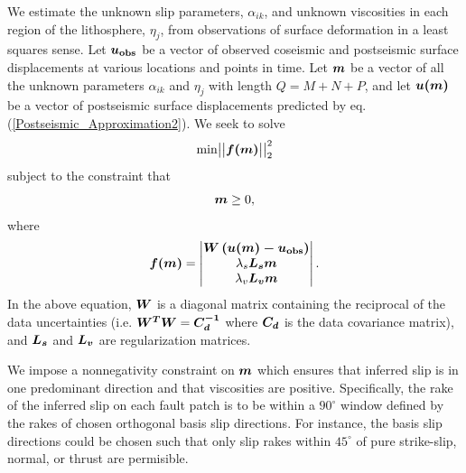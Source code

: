 \documentclass[extra,mreferee]{gji}
\begin{document}
We estimate the unknown slip parameters, $\alpha_{ik}$, and unknown
viscosities in each region of the lithosphere, $\eta_j$, from
observations of surface deformation in a least squares sense. Let
$\mitbf{u_{\mathrm{obs}}}$ be a vector of observed coseismic and postseismic
surface displacements at various locations and points in time.  Let
$\mitbf{m}$ be a vector of all the unknown parameters $\alpha_{ik}$
and $\eta_j$ with length $Q=M+N+P$, and let $\mitbf{u(m)}$ be a vector
of postseismic surface displacements predicted by eq.
(\ref{Postseismic_Approximation2}). We seek to solve
\begin{equation}\label{Inverse_Problem}
  \mathrm{min}
  \big|\big|\mitbf{f(m)}\big|\big|_2^2
\end{equation}
subject to the constraint that
\begin{equation}
  \mitbf{m}\geq0,
\end{equation}
where 
\begin{equation}\label{ResidualFunction}
  \mitbf{f(m)} = 
    \begin{vmatrix}
      \mitbf{W\left(u(m)-u_{\mathrm{obs}}\right)}\\
      \lambda_s\mitbf{L_sm}\\
      \lambda_v\mitbf{L_vm}\\
    \end{vmatrix} .
\end{equation}  
In the above equation, $\mitbf{W}$ is a diagonal matrix containing the
reciprocal of the data uncertainties
(i.e. $\mitbf{W^TW}=\mitbf{C_d^{-1}}$ where $\mitbf{C_d}$ is
the data covariance matrix), and $\mitbf{L_s}$ and $\mitbf{L_v}$ are
regularization matrices.

We impose a nonnegativity constraint on $\mitbf{m}$ which ensures that
inferred slip is in one predominant direction and that viscosities are
positive.  Specifically, the rake of the inferred slip on each fault
patch is to be within a $90^\circ$ window defined by the rakes of
chosen orthogonal basis slip directions. For instance, the basis slip
directions could be chosen such that only slip rakes within $45^\circ$
of pure strike-slip, normal, or thrust are permisible.
\end{document}
